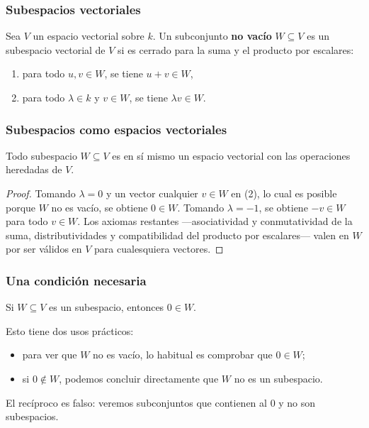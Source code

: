 \begin{frame}
    \frametitle{Subespacios vectoriales}

    \begin{definition}
        Sea $V$ un espacio vectorial sobre $k$. Un subconjunto \textbf{no vacío}
        $W\subseteq V$ es un \alert{subespacio vectorial} de $V$ si es
        cerrado para la suma y el producto por escalares:
        \begin{enumerate}
            \item para todo $u,v\in W$, se tiene $u+v\in W$,
            \item para todo $\lambda\in k$ y $v\in W$, se tiene $\lambda v\in W$.
        \end{enumerate}
    \end{definition}

\end{frame}

\begin{frame}
    \frametitle{Subespacios como espacios vectoriales}

    \begin{proposition}
        Todo subespacio $W\subseteq V$ es en sí mismo un espacio vectorial
        con las operaciones heredadas de $V$.
    \end{proposition}

    \begin{proof}
        Tomando $\lambda=0$ y un vector cualquier $v\in W$ en (2), lo cual es posible porque $W$ no es vacío, se obtiene $0\in W$.
        Tomando $\lambda=-1$, se obtiene $-v\in W$ para todo $v\in W$.
        Los axiomas restantes —asociatividad y conmutatividad de la suma,
        distributividades y compatibilidad del producto por escalares—
        valen en $W$ por ser válidos en $V$ para cualesquiera vectores.
    \end{proof}
\end{frame}

\begin{frame}
    \frametitle{Una condición necesaria}
    
    \begin{corollary}
        Si $W\subseteq V$ es un subespacio, entonces $0\in W$.
    \end{corollary}

    \medskip

    Esto tiene dos usos prácticos:
    \begin{itemize}
        \item para ver que $W$ \alert{no es vacío}, lo habitual es comprobar
        que $0\in W$;
        \item si $0\notin W$, podemos concluir directamente que $W$
        \alert{no} es un subespacio.
    \end{itemize}

    \medskip

    El recíproco es falso: veremos subconjuntos que contienen al $0$
    y no son subespacios.
\end{frame}

